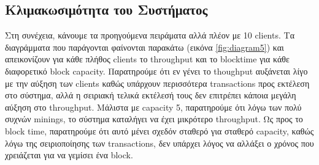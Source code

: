 \documentclass[12pt, a4paper]{article}
\begin{document}
	\subsection{Κλιμακωσιμότητα του Συστήματος}
	Στη συνέχεια, κάνουμε τα προηγούμενα πειράματα αλλά πλέον με 10 clients. Τα διαγράμματα που παράγονται φαίνονται παρακάτω (εικόνα \ref{fig:diagram5}) και απεικονίζουν για κάθε πλήθος clients το throughput και το blocktime για κάθε διαφορετικό block capacity. Παρατηρούμε ότι εν γένει το thoughput αυξάνεται λίγο με την αύξηση των clients καθώς υπάρχουν περισσότερα transactions προς εκτέλεση στο σύστημα, αλλά η σειριακή τελικά εκτέλεσή τους δεν επιτρέπει κάποια μεγάλη αύξηση στο throughput. Μάλιστα με capacity 5, παρατηρούμε ότι λόγω των πολύ συχνών minings, το σύστημα καταλήγει να έχει μικρότερο throughput. Ως προς το block time, παρατηρούμε ότι αυτό μένει σχεδόν σταθερό για σταθερό capacity, καθώς λόγω της σειριοποίησης των transactions, δεν υπάρχει λόγος να αλλάξει ο χρόνος που χρειάζεται για να γεμίσει ένα block.
\end{document}
